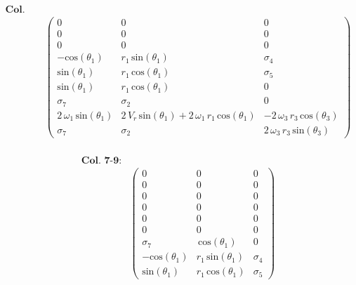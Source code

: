 \documentclass[12pt]{article}
\begin{document}
\begin{turn}{90}
\begin{equation*}
\begin{array}{cc}
\mathrm{\textbf{Col. 4-6:}}&\\
&\left(\begin{array}{ccc}
 0 & 0 & 0 \\
0 & 0 & 0\\
0 & 0 & 0\\
-\mathrm{cos}\left(\theta_1 \right) & r_1 \,\mathrm{sin}\left(\theta_1 \right) & \sigma_4 \\
\mathrm{sin}\left(\theta_1 \right) & r_1 \,\mathrm{cos}\left(\theta_1 \right) & \sigma_5 \\
\mathrm{sin}\left(\theta_1 \right) & r_1 \,\mathrm{cos}\left(\theta_1 \right) & 0 \\
\sigma_7  & \sigma_2  & 0 \\
2\,\omega_1 \,\mathrm{sin}\left(\theta_1 \right) & 2\,V_r \,\mathrm{sin}\left(\theta_1 \right)+2\,\omega_1 \,r_1 \,\mathrm{cos}\left(\theta_1 \right) & -2\,\omega_3 \,r_3 \,\mathrm{cos}\left(\theta_3 \right) \\
\sigma_7  & \sigma_2  & 2\,\omega_3 \,r_3 \,\mathrm{sin}\left(\theta_3 \right) 
\end{array}\right)\\
\end{array}
\end{equation*}
\end{turn}
\begin{turn}{90}
\begin{equation*}
\begin{array}{cc}
\mathrm{\textbf{Col. 7-9:}}&\\
&\left(\begin{array}{ccc}
0 & 0 & 0\\
0 & 0 & 0\\
0 & 0 & 0\\
0 & 0 & 0\\
0 & 0 & 0\\
0 & 0 & 0\\
\sigma_7  & \,\mathrm{cos}\left(\theta_1 \right) & 0\\
-\mathrm{cos}\left(\theta_1 \right) & r_1 \,\mathrm{sin}\left(\theta_1 \right) & \sigma_4 \\
\mathrm{sin}\left(\theta_1 \right) & r_1 \,\mathrm{cos}\left(\theta_1 \right) & \sigma_5 
\end{array}\right)\\
\end{array}
\end{equation*}
\end{turn}
\end{document}
